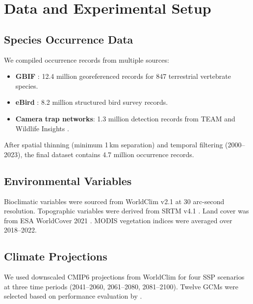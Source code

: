 \section{Data and Experimental Setup}

\label{sec:data}

\subsection{Species Occurrence Data}

We compiled occurrence records from multiple sources:

\begin{itemize}
  \item \textbf{GBIF} \citep{gbif2024}: 12.4 million georeferenced
    records for 847 terrestrial vertebrate species.
  \item \textbf{eBird} \citep{sullivan2009ebird}: 8.2 million
    structured bird survey records.
  \item \textbf{Camera trap networks}: 1.3 million detection records
    from TEAM \citep{jansen2014team} and Wildlife Insights
    \citep{ahumada2020wildlife}.
\end{itemize}

After spatial thinning (minimum 1\,km separation) and temporal filtering
(2000--2023), the final dataset contains 4.7 million occurrence records.

\subsection{Environmental Variables}

Bioclimatic variables were sourced from WorldClim v2.1
\citep{fick2017worldclim} at 30 arc-second resolution. Topographic
variables were derived from SRTM v4.1 \citep{jarvis2008srtm}. Land cover
was from ESA WorldCover 2021 \citep{zanaga2022esa}. MODIS vegetation
indices were averaged over 2018--2022.

\subsection{Climate Projections}

We used downscaled CMIP6 projections from WorldClim
\citep{fick2017worldclim} for four SSP scenarios at three time periods
(2041--2060, 2061--2080, 2081--2100). Twelve GCMs were selected based
on performance evaluation by \citet{arias2021climate}.

